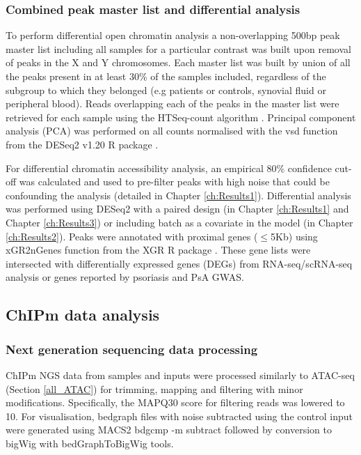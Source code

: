 \subsubsection{Combined peak master list and differential analysis}
To perform differential open chromatin analysis a non-overlapping 500bp peak master list including all samples for a particular contrast was built upon removal of peaks in the X and Y chromosomes. Each master list was built by union of all the peaks present in at least 30\% of the samples included, regardless of the subgroup to which they belonged (e.g patients or controls, synovial fluid or peripheral blood).  Reads overlapping each of the peaks in the master list were retrieved for each sample using the HTSeq-count algorithm \parencite{Anders2015}. Principal component analysis (PCA) was performed on all counts normalised with the vsd function from the DESeq2 v1.20 R package \parencite{Love2014}.

For differential chromatin accessibility analysis, an empirical 80\% confidence cut-off was calculated and used to pre-filter peaks with high noise that could be confounding the analysis (detailed in Chapter \ref{ch:Results1}). Differential analysis was performed using DESeq2 with a paired design (in Chapter \ref{ch:Results1} and Chapter \ref{ch:Results3}) or including batch as a covariate in the model (in Chapter \ref{ch:Results2}). Peaks were annotated with proximal genes ($\leq$5Kb) using xGR2nGenes function from the XGR R package \parencite{Fang2016}. These gene lists were intersected with differentially expressed genes (DEGs) from RNA-seq/scRNA-seq analysis or genes reported by psoriasis and PsA GWAS.





\subsection{ChIPm data analysis}

\subsubsection{Next generation sequencing data processing}
ChIPm NGS data from samples and inputs were processed similarly to ATAC-seq (Section \ref{all_ATAC}) for trimming, mapping and filtering with minor modifications. Specifically, the MAPQ30 score for filtering reads was lowered to 10. For visualisation, bedgraph files with noise subtracted using the control input were generated using MACS2 bdgcmp -m subtract followed by conversion to bigWig with bedGraphToBigWig tools.

